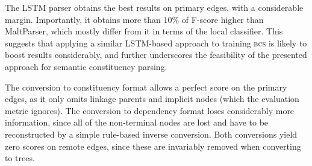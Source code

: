 \documentclass[11pt]{article}
\begin{document}
The LSTM parser obtains the best results on primary edges,
with a considerable margin. Importantly, it obtains more than
10\% of F-score higher than MaltParser, which mostly differ
from it in terms of the local classifier.
This suggests that applying a similar LSTM-based approach to
training \textsc{bcs} is likely to boost results considerably,
and further underscores the feasibility
of the presented approach for semantic constituency parsing. 



The conversion to constituency format allows a perfect score on the
primary edges, as it only omits linkage parents and implicit nodes (which the evaluation metric ignores).
The conversion to dependency format loses considerably more information, since all of the non-terminal nodes are lost and have to be reconstructed by a simple rule-based inverse conversion.
Both conversions yield zero scores on remote edges, since these are invariably removed when converting to trees.
\end{document}
